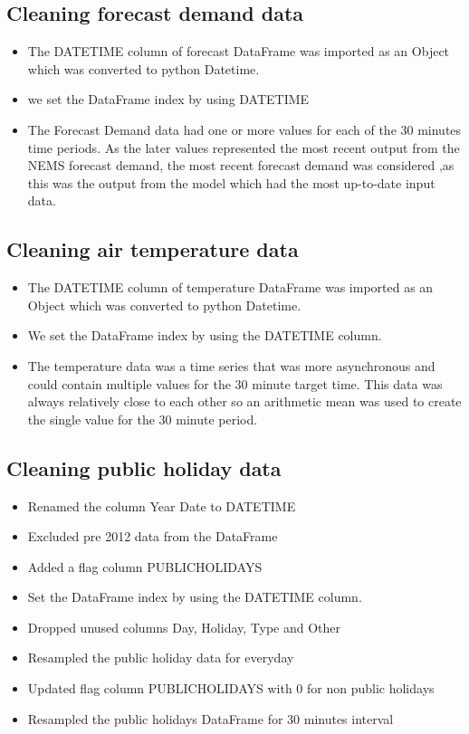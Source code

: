 \documentclass[mstat,12pt]{unswthesis}
\begin{document}
\hypertarget{cleaning-forecast-demand-data}{%
\subsection{Cleaning forecast demand
data}\label{cleaning-forecast-demand-data}}

\begin{itemize}
\item The DATETIME column of forecast DataFrame was imported as an Object which was converted to python Datetime. 
\item we set the DataFrame index by using DATETIME
\item The Forecast Demand data had one or more values for each of the 30 minutes time periods. As the later values represented the most recent output from the NEMS forecast demand, the most recent forecast demand was considered ,as this was the output from the model which had the most up-to-date input data.
\end{itemize}

\hypertarget{cleaning-air-temperature-data}{%
\subsection{Cleaning air temperature
data}\label{cleaning-air-temperature-data}}

\begin{itemize}
\item The DATETIME column of temperature DataFrame was imported as an Object which was converted to python Datetime. 
\item We set the DataFrame index by using the DATETIME column.
\item The temperature data was a time series that was more asynchronous and could contain multiple values for the 30 minute target time. This data was always relatively close to each other so an arithmetic mean was used to create the single value for the 30 minute period.
\end{itemize}

\hypertarget{cleaning-public-holiday-data}{%
\subsection{Cleaning public holiday
data}\label{cleaning-public-holiday-data}}

\begin{itemize}
\item Renamed the column Year Date to DATETIME
\item Excluded pre 2012 data from the DataFrame
\item Added a flag column PUBLICHOLIDAYS
\item Set the DataFrame index by using the DATETIME column.
\item Dropped unused columns Day, Holiday, Type and Other
\item Resampled the public holiday data for everyday
\item Updated  flag column PUBLICHOLIDAYS with 0 for non public holidays
\item Resampled the public holidays DataFrame for 30 minutes interval
\end{itemize}
\end{document}
